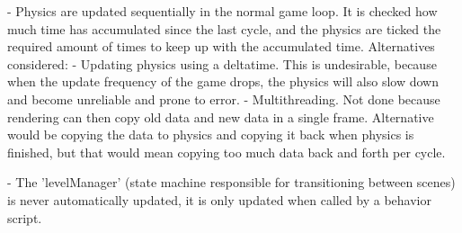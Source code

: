 - Physics are updated sequentially in the normal game loop. It is checked how much time has accumulated since the last cycle, and the physics are ticked the required amount of times to keep up with the accumulated time.
  Alternatives considered:
    - Updating physics using a deltatime. This is undesirable, because when the update frequency of the game drops, the physics will also slow down and become unreliable and prone to error.
    - Multithreading. Not done because rendering can then copy old data and new data in a single frame. Alternative would be copying the data to physics and copying it back when physics is finished, but that would mean copying too much data back and forth per cycle.

- The 'levelManager' (state machine responsible for transitioning between scenes) is never automatically updated, it is only updated when called by a behavior script.